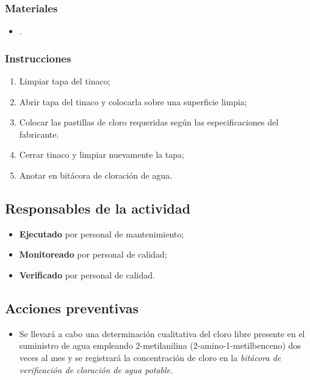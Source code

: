 \subsubsection{Materiales}
\begin{itemize}
	\item \BitClor.
\end{itemize}

\subsubsection{Instrucciones}

\begin{enumerate}
	\item Limpiar tapa del tinaco;
	\item Abrir tapa del tinaco y colocarla sobre una superficie limpia;
	\item Colocar las pastillas de cloro requeridas según las especificaciones del fabricante.
	\item Cerrar tinaco y limpiar nuevamente la tapa;
	\item Anotar en bitácora de cloración de agua.
\end{enumerate}

\subsection{Responsables de la actividad}

\begin{itemize}
	\item \textbf{Ejecutado} por personal de mantenimiento;
	\item \textbf{Monitoreado} por personal de calidad;
	\item \textbf{Verificado} por personal de calidad.
\end{itemize}

\subsection{Acciones preventivas}

\begin{itemize}
	\item Se llevará a cabo una determinación cualitativa del cloro libre presente en el suministro de agua empleando 2-metilanilina (2-amino-1-metilbenceno) dos veces al mes y se registrará la concentración de cloro en la \emph{bitácora de verificación de cloración de agua potable.}
\end{itemize}


